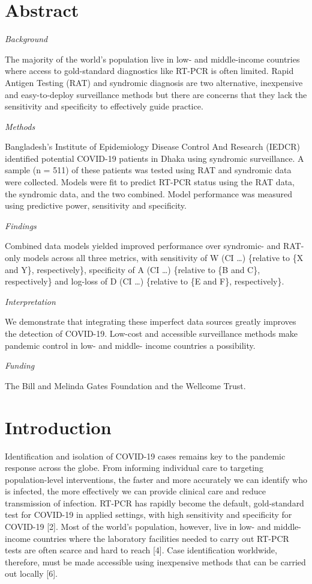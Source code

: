 \documentclass[]{elsarticle} %
\begin{document}
\hypertarget{abstract}{%
\section{Abstract}\label{abstract}}

\emph{Background}

The majority of the world's population live in low- and middle-income
countries where access to gold-standard diagnostics like RT-PCR is often
limited. Rapid Antigen Testing (RAT) and syndromic diagnosis are two
alternative, inexpensive and easy-to-deploy surveillance methods but
there are concerns that they lack the sensitivity and specificity to
effectively guide practice.

\emph{Methods}

Bangladesh's Institute of Epidemiology Disease Control And Research
(IEDCR) identified potential COVID-19 patients in Dhaka using syndromic
surveillance. A sample (n = 511) of these patients was tested using RAT
and syndromic data were collected. Models were fit to predict RT-PCR
status using the RAT data, the syndromic data, and the two combined.
Model performance was measured using predictive power, sensitivity and
specificity.

\emph{Findings}

Combined data models yielded improved performance over syndromic- and
RAT-only models across all three metrics, with sensitivity of W (CI
\ldots) \{relative to \{X and Y\}, respectively\}, specificity of A (CI
\ldots) \{relative to \{B and C\}, respectively\} and log-loss of D (CI
\ldots) \{relative to \{E and F\}, respectively\}.

\emph{Interpretation}

We demonstrate that integrating these imperfect data sources greatly
improves the detection of COVID-19. Low-cost and accessible surveillance
methods make pandemic control in low- and middle- income countries a
possibility.

\emph{Funding}

The Bill and Melinda Gates Foundation and the Wellcome Trust.

\hypertarget{introduction}{%
\section{Introduction}\label{introduction}}

Identification and isolation of COVID-19 cases remains key to the
pandemic response across the globe. From informing individual care to
targeting population-level interventions, the faster and more accurately
we can identify who is infected, the more effectively we can provide
clinical care and reduce transmission of infection. RT-PCR has rapidly
become the default, gold-standard test for COVID-19 in applied settings,
with high sensitivity and specificity for COVID-19 {[}2{]}. Most of the
world's population, however, live in low- and middle-income countries
where the laboratory facilities needed to carry out RT-PCR tests are
often scarce and hard to reach {[}4{]}. Case identification worldwide,
therefore, must be made accessible using inexpensive methods that can be
carried out locally {[}6{]}.
\end{document}
